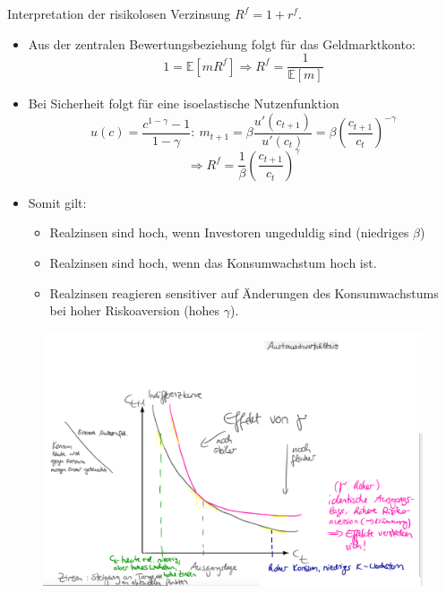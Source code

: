 \documentclass[12pt]{extreport} %
\theoremstyle{named}
\theoremstyle{nnamed}
\theoremstyle{itshape}
\theoremstyle{normal}
\begin{document}
Interpretation der risikolosen Verzinsung $R^f = 1 + r^f$.
\begin{itemize}
	\item Aus der zentralen Bewertungsbeziehung folgt für das Geldmarktkonto:
		$$ 1 = \mathbb{E} \left[ m R^f \right] \Rightarrow R^f = \frac{1}{\mathbb{E}[m]} $$
	\item Bei Sicherheit folgt für eine isoelastische Nutzenfunktion
		$$ u(c) = \frac{c^{1-\gamma} - 1}{1 - \gamma}: ~ m_{t+1} = \beta \frac{u'(c_{t+1})}{u'(c_{t})} = \beta \left( \frac{c_{t+1}}{c_t} \right)^{-\gamma} $$
		$$ \Rightarrow R^f = \frac{1}{\beta} \left( \frac{c_{t+1}}{c_t} \right)^{\gamma} $$
	\item Somit gilt:
		\begin{itemize}
			\item Realzinsen sind hoch, wenn Investoren ungeduldig sind (niedriges $\beta$)
			\item Realzinsen sind hoch, wenn das Konsumwachstum hoch ist.
			\item Realzinsen reagieren sensitiver auf Änderungen des Konsumwachstums bei hoher Riskoaversion (hohes $\gamma$).
		\end{itemize}
\end{itemize}
	
	
\begin{figure}[h!] \centering
	\includegraphics[scale=0.2725]{img/p29}
\end{figure}
\end{document}
